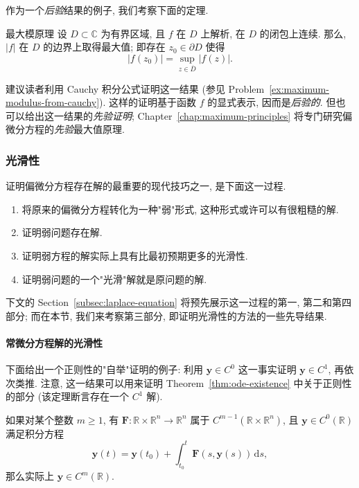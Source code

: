 作为一个\emph{后验}结果的例子, 我们考察下面的定理.

\begin{Theorem}{最大模原理}
\label{thm:maximum-modulus}
设 $D\subset\mathbb{C}$ 为有界区域, 且 $f$ 在 $D$ 上解析, 在 $D$ 的闭包上连续. 那么, $|f|$ 在 $D$ 的边界上取得最大值; 即存在 $z_0\in\partial D$ 使得
\begin{equation}\label{eq:analytic-maximum-modulus}
|f(z_0)|=\sup_{z\in\overline{D}}|f(z)|.
\end{equation}

\end{Theorem}

建议读者利用 Cauchy 积分公式证明这一结果 (参见 Problem~\ref{ex:maximum-modulus-from-cauchy}). 这样的证明基于函数 $f$ 的显式表示, 因而是\emph{后验的}. 但也可以给出这一结果的\emph{先验证明}; Chapter~\ref{chap:maximum-principles} 将专门研究偏微分方程的\emph{先验}最大值原理.

\subsubsection{光滑性}\label{subsec:smoothness}

证明偏微分方程存在解的最重要的现代技巧之一, 是下面这一过程.
\begin{enumerate}
\item 将原来的偏微分方程转化为一种"弱"形式, 这种形式或许可以有很粗糙的解.
\item 证明弱问题存在解.
\item 证明弱方程的解实际上具有比最初预期更多的光滑性.
\item 证明弱问题的一个"光滑"解就是原问题的解.
\end{enumerate}

下文的 Section~\ref{subsec:laplace-equation} 将预先展示这一过程的第一, 第二和第四部分; 而在本节, 我们来考察第三部分, 即证明光滑性的方法的一些先导结果.

\paragraph*{常微分方程解的光滑性}

下面给出一个正则性的"自举"证明的例子: 利用 $\bm{y}\in C^0$ 这一事实证明 $\bm{y}\in C^1$, 再依次类推. 注意, 这一结果可以用来证明 Theorem~\ref{thm:ode-existence} 中关于正则性的部分 (该定理断言存在一个 $C^1$ 解).

\begin{Theorem}
\label{thm:ode-bootstrap-regularity}
如果对某个整数 $m\geq1$, 有 $\bm{F}:\mathbb{R}\times\mathbb{R}^n\to\mathbb{R}^n$ 属于 $C^{m-1}(\mathbb{R}\times\mathbb{R}^n)$, 且 $\bm{y}\in C^0(\mathbb{R})$ 满足积分方程
\begin{equation}\label{eq:ode-bootstrap-integral-equation}
\bm{y}(t)=\bm{y}(t_0)+\int_{t_0}^t\bm{F}(s,\bm{y}(s))\,\mathrm{d}s,
\end{equation}
那么实际上 $\bm{y}\in C^m(\mathbb{R})$.
\end{Theorem}

